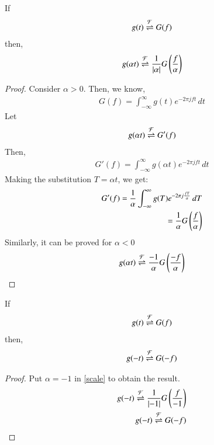 \documentclass[journal,12pt,twocolumn]{IEEEtran}
\begin{document}
\begin{lemma}
If 
\begin{align}
    g(t) \overset{\mathcal{F}}{ \rightleftharpoons} G(f)
\end{align}
then,
\begin{align}
    g(\alpha t) \overset{\mathcal{F}}{ \rightleftharpoons} \frac{1}{\left\vert\alpha\right\vert}G\left(\frac{f}{\alpha}\right)
\end{align}
\label{scale}
\end{lemma}
\begin{proof}
Consider $\alpha > 0$. Then, we know, 
\begin{align}
    G(f) = \int_{-\infty}^\infty g(t) e^{-2\pi j ft} \,dt
\end{align}
Let 
\begin{align}
    g(\alpha t) \overset{\mathcal{F}}{ \rightleftharpoons} G'(f)
\end{align}
Then,
\begin{align}
    G'(f) = \int_{-\infty}^\infty g(\alpha t) e^{-2\pi j ft} \,dt
\end{align}
Making the substitution $T = \alpha t$, we get:
\begin{align}
     G'(f) = \frac{1}{\alpha}\int_{-\infty}^\infty g(T) e^{-2\pi j \frac{f T}{\alpha}} \,dT\\
     = \frac{1}{\alpha}G\left(\frac{f}{\alpha}\right)
\end{align}
Similarly, it can be proved for $\alpha < 0$
\begin{align}
    g(\alpha t) \overset{\mathcal{F}}{ \rightleftharpoons} \frac{-1}{\alpha}G\left(\frac{-f}{\alpha}\right)
\end{align}
\end{proof}
\begin{lemma}
If 
\begin{align}
    g(t) \overset{\mathcal{F}}{ \rightleftharpoons} G(f)
\end{align}
then,
\begin{align}
    g(- t) \overset{\mathcal{F}}{ \rightleftharpoons} G(-f)
\end{align}
\label{reverse}
\end{lemma}
\begin{proof}
Put $\alpha = -1$ in \eqref{scale} to obtain the result.
\begin{align}
    g(-t) \overset{\mathcal{F}}{ \rightleftharpoons} \frac{1}{\left\vert-1\right\vert}G\left(\frac{f}{-1}\right)\\
    g(-t) \overset{\mathcal{F}}{ \rightleftharpoons} G(-f)
\end{align}
\end{proof}
\end{document}

